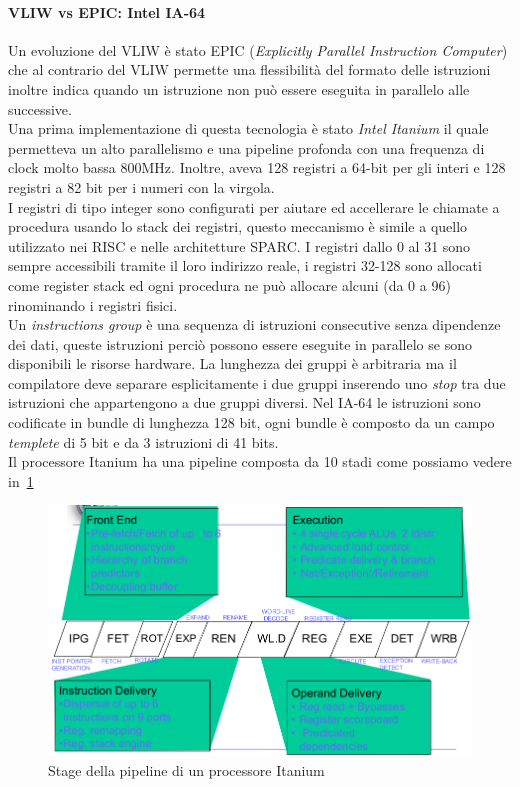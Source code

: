 \paragraph{VLIW vs EPIC: Intel IA-64}
Un evoluzione del VLIW è stato EPIC (\emph{Explicitly Parallel Instruction Computer}) che al contrario del VLIW permette una flessibilità del formato delle istruzioni inoltre indica quando un istruzione non può essere eseguita in parallelo alle successive.\\
Una prima implementazione di questa tecnologia è stato \emph{Intel Itanium} il quale permetteva un alto parallelismo e una pipeline profonda con una frequenza di clock molto bassa 800MHz. Inoltre, aveva 128 registri a 64-bit per gli interi e 128 registri a 82 bit per i numeri con la virgola.\\
I registri di tipo integer sono configurati per aiutare ed accellerare le chiamate a procedura usando lo stack dei registri, questo meccanismo è simile a quello utilizzato nei RISC e nelle architetture SPARC. I registri dallo 0 al 31 sono sempre accessibili tramite il loro indirizzo reale, i registri 32-128 sono allocati come register stack ed ogni procedura ne può allocare alcuni (da 0 a 96) rinominando i registri fisici.\\
Un \emph{instructions group} è una sequenza di istruzioni consecutive senza dipendenze dei dati, queste istruzioni perciò possono essere eseguite in parallelo se sono disponibili le risorse hardware. La lunghezza dei gruppi è arbitraria ma il compilatore deve separare esplicitamente i due gruppi inserendo uno \emph{stop} tra due istruzioni che appartengono a due gruppi diversi. Nel IA-64 le istruzioni sono codificate in bundle di lunghezza 128 bit, ogni bundle è composto da un campo \emph{templete} di 5 bit e da 3 istruzioni di 41 bits.\\
Il processore Itanium ha una pipeline composta da 10 stadi come possiamo vedere in \figurename\,\ref{fig:itapipe}
\begin{figure}
\centering
\includegraphics[scale=0.5]{img/itapipe.png}
\caption{Stage della pipeline di un processore Itanium}\label{fig:itapipe}
\end{figure}

